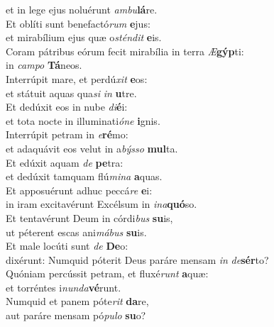 \oddverse et in lege ejus noluérunt \textit{am}\textit{bu}\textbf{lá}re.\\
\evenverse Et oblíti sunt benefactó\textit{rum} \textbf{e}jus:~\*\\
\evenverse et mirabílium ejus quæ o\textit{stén}\textit{dit} \textbf{e}is.\\
\oddverse Coram pátribus eórum fecit mirabília in terra \textit{Æ}\textbf{gýp}ti:~\*\\
\oddverse in \textit{cam}\textit{po} \textbf{Tá}neos.\\
\evenverse Interrúpit mare, et perdú\textit{xit} \textbf{e}os:~\*\\
\evenverse et státuit aquas qua\textit{si} \textit{in} \textbf{u}tre.\\
\oddverse Et dedúxit eos in nube \textit{di}\textbf{é}i:~\*\\
\oddverse et tota nocte in illuminati\textit{ó}\textit{ne} \textbf{i}gnis.\\
\evenverse Interrúpit petram in \textit{e}\textbf{ré}mo:~\*\\
\evenverse et adaquávit eos velut in a\textit{býs}\textit{so} \textbf{mul}ta.\\
\oddverse Et edúxit aquam \textit{de} \textbf{pe}tra:~\*\\
\oddverse et dedúxit tamquam flú\textit{mi}\textit{na} \textbf{a}quas.\\
\evenverse Et apposuérunt adhuc peccá\textit{re} \textbf{e}i:~\*\\
\evenverse in iram excitavérunt Excélsum in \textit{i}\textit{na}\textbf{quó}so.\\
\oddverse Et tentavérunt Deum in córdi\textit{bus} \textbf{su}is,~\*\\
\oddverse ut péterent escas ani\textit{má}\textit{bus} \textbf{su}is.\\
\evenverse Et male locúti sunt \textit{de} \textbf{De}o:~\*\\
\evenverse dixérunt: Numquid póterit Deus paráre mensam \textit{in} \textit{de}\textbf{sér}to?\\
\oddverse Quóniam percússit petram, et fluxé\textit{runt} \textbf{a}quæ:~\*\\
\oddverse et torréntes i\textit{nun}\textit{da}\textbf{vé}runt.\\
\evenverse Numquid et panem póte\textit{rit} \textbf{da}re,~\*\\
\evenverse aut paráre mensam pó\textit{pu}\textit{lo} \textbf{su}o?\\
